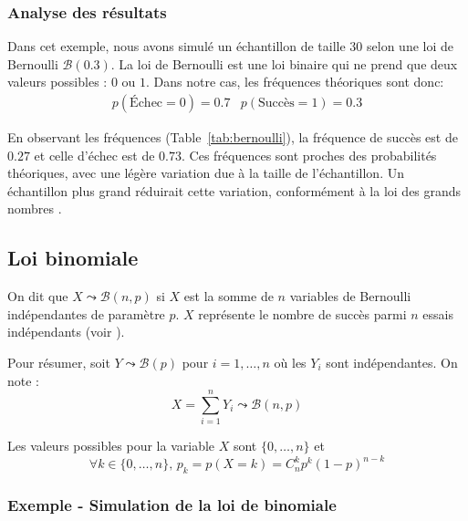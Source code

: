 \subsubsection{Analyse des résultats}
  Dans cet exemple, nous avons simulé un échantillon de taille $30$ selon une loi de Bernoulli $\mathcal B(0.3)$.
  La loi de Bernoulli est une loi binaire qui ne prend que deux valeurs possibles : $0$ ou $1$.
  Dans notre cas, les fréquences théoriques sont donc:
  \[
    \begin{array}{cc}
      p(\text{Échec}=0) = 0.7 &
      p(\text{Succès}=1) = 0.3
  \end{array}
  \]

  En observant les fréquences (Table~\ref{tab:bernoulli}), la fréquence de succès est de $0.27$ et celle d'échec est de $0.73$.
  Ces fréquences sont proches des probabilités théoriques, avec une légère variation due à la taille de l'échantillon.
  Un échantillon plus grand réduirait cette variation, conformément à la loi des grands nombres \cite{lawoflargeNumbers}.

\subsection{Loi binomiale}
  On dit que $X \leadsto \mathcal B(n,p)$ si $X$ est la somme de $n$ variables de Bernoulli indépendantes de paramètre $p$. $X$ représente le nombre de succès parmi $n$ essais indépendants (voir \cite{binomiallaw}).
  
  Pour résumer, soit $Y \leadsto \mathcal B(p)$ pour $i=1,\ldots,n$ où les $Y_i$ sont indépendantes. On note :
  \begin{equation}
    X = \sum_{i=1}^n Y_i \leadsto \mathcal B(n,p)
  \end{equation}

  Les valeurs possibles pour la variable $X$ sont $\{0,\ldots,n\}$ et 
  \begin{equation}
    \forall k\in\{0,\ldots,n\},\, p_k=p(X=k)=C_n^k p^k (1-p)^{n-k}
  \end{equation}

  \subsubsection{Exemple - Simulation de la loi de binomiale}

